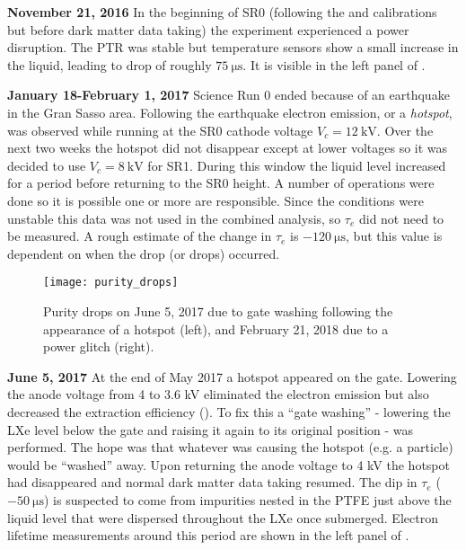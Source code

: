 \textbf{November 21, 2016}  In the beginning of SR0 (following the \ambe and \metakr calibrations but before dark matter data taking) the
experiment experienced a power disruption.  The PTR was stable but temperature sensors show a small increase in the
liquid, leading to drop of roughly $75\ \mathrm{\mu s}$.  It is visible in the left panel of
.

\textbf{January 18-February 1, 2017} Science Run 0 ended because of an earthquake in the Gran Sasso area.  Following the earthquake
electron emission, or a \textit{hotspot}, was observed while running at the SR0 cathode voltage $V_c = 12\ \mathrm{kV}$.  Over the next two
weeks the hotspot did not disappear except at lower voltages so it was decided to use $V_c = 8\ \mathrm{kV}$ for SR1.  During this window
the liquid level increased for a period before returning to the SR0 height.  A number of operations were done so it is possible one or more
are responsible.  Since the conditions were unstable this data was not used in the
combined analysis, so $\tau_e$ did not need to be measured.  A rough estimate of the change in $\tau_e$ is $-120\ \mathrm{\mu s}$, but this
value is dependent on when the drop (or drops) occurred.

\begin{figure}
\centering
\texttt{[image: purity\_drops]}
\caption{Purity drops on June 5, 2017 due to gate washing following the appearance of a hotspot (left), and February 21, 2018 due to a power
glitch (right).}
\label{fig:electron_lifetime_model_detector_effects_spikes_examples}
\end{figure}

\textbf{June 5, 2017}  At the end of May 2017 a hotspot appeared on the gate.  Lowering the anode voltage from 4 to 3.6 kV eliminated the
electron emission but also decreased the extraction efficiency ().  To fix this
a ``gate washing'' - lowering the LXe level below the gate and raising it again to its original position - was performed.  The hope was that
whatever was causing the hotspot (e.g. a particle) would be ``washed''
away.  Upon returning the anode voltage to 4 kV the hotspot had disappeared and normal dark matter data taking resumed.  The dip in
$\tau_e$ ($-50\ \mathrm{\mu s}$) is suspected to come from impurities nested in the PTFE just above the liquid level that were dispersed
throughout the LXe once submerged.  Electron lifetime measurements around this period are shown in the left panel of
.

